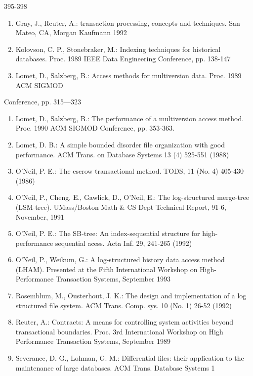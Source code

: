 \documentclass[a4paper,11pt,notitlepage,twoside,openright]{article}
\begin{document}
395-398


\begin{enumerate}
\def\labelenumi{\arabic{enumi}.}
\setcounter{enumi}{13}
\item
  Gray, J., Reuter, A.: transaction processing, concepts and techniques.
  San Mateo, CA, Morgan Kaufmann 1992
\item
  Kolovson, C. P., Stonebraker, M.: Indexing techniques for historical
  databases. Proc. 1989 IEEE Data Engineering Conference, pp. 138-147
\item
  Lomet, D., Salzberg, B.: Access methods for multiversion data. Proc.
  1989 ACM SIGMOD
\end{enumerate}


Conference, pp. 315---323


\begin{enumerate}
\def\labelenumi{\arabic{enumi}.}
\setcounter{enumi}{16}
\item
  Lomet, D., Salzberg, B.: The performance of a multiversion access
  method. Proc. 1990 ACM SIGMOD Conference, pp. 353-363.
\item
  Lomet, D. B.: A simple bounded disorder file organization with good
  performance. ACM Trans. on Database Systems 13 (4) 525-551 (1988)
\item
  O'Neil, P. E.: The escrow transactional method. TODS, 11 (No. 4)
  405-430 (1986)
\item
  O'Neil, P., Cheng, E., Gawlick, D., O'Neil, E.: The log-structured
  merge-tree (LSM-tree). UMass/Boston Math \& CS Dept Technical Report,
  91-6, November, 1991
\item
  O'Neil, P. E.: The SB-tree: An index-sequential structure for
  high-performance sequential acess. Acta Inf. 29, 241-265 (1992)
\item
  O'Neil, P., Weikum, G.: A log-structured history data access method
  (LHAM). Presented at the Fifth International Workshop on
  High-Performance Transaction Systems, September 1993
\item
  Rosemblum, M., Ousterhout, J. K.: The design and implementation of a
  log structured file system. ACM Trans. Comp. sys. 10 (No. 1) 26-52
  (1992)
\item
  Reuter, A.: Contracts: A means for controlling system activities
  beyond transactional boundaries. Proc. 3rd International Workshop on
  High Performance Transaction Systems, September 1989
\item
  Severance, D. G., Lohman, G. M.: Differential files: their application
  to the maintenance of large databases. ACM Trans. Database Systems 1

\end{enumerate}
\end{document}
